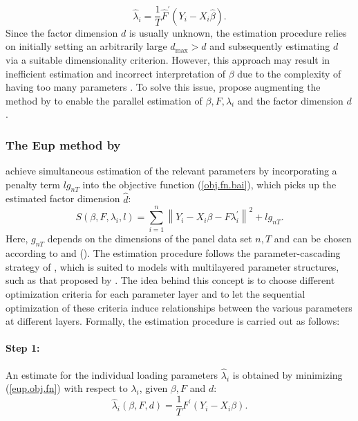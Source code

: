 \begin{equation}
    \hat{\lambda}_i = \frac{1}{T}\hat{F}^{\prime}(Y_i - X_i \hat{\beta}).
\end{equation}
Since the factor dimension $d$ is usually unknown, the estimation procedure relies on initially setting an arbitrarily large $d_{\text{max}} > d$ and subsequently estimating $d$ via a suitable dimensionality criterion. However, this approach may result in inefficient estimation and incorrect interpretation of \(\beta\) due to the complexity of having too many parameters \citep{bada2012phtt}. To solve this issue, \citet{bada2014parameter} propose augmenting the method by \citet{bai2009panel} to enable the parallel estimation of $\beta, F, \lambda_i$ and the factor dimension $d$.

\subsubsection{The \acl{Eup} method by \citet{bada2014parameter}}

\citet{bada2014parameter} achieve simultaneous estimation of the relevant parameters by incorporating a penalty term \(lg_{nT}\) into the objective function (\ref{obj.fn.bai}),  which picks up the estimated factor dimension $\hat{d}$:
\begin{equation}\label{eup.obj.fn}
    S\left(\beta, F, \lambda_i, l\right)=\sum_{i=1}^n\left\|Y_i-X_i \beta-F \lambda_i^{\prime}\right\|^2+l g_{n T} .
\end{equation}
Here, $g_{nT}$ depends on the dimensions of the panel data set $n, T$ and can be chosen according to \citet{bai2002determining} and \citet{bai2004estimating} (). The estimation procedure follows the parameter-cascading strategy of \citet{cao2010linear}, which is suited to models with multilayered parameter structures, such as that proposed by \citet{bai2009panel}.  The idea behind this concept is to choose different optimization criteria for each parameter layer and to let the sequential optimization of these criteria induce relationships between the various parameters at different layers. Formally, the estimation procedure is carried out as follows:

\paragraph{Step 1:} An estimate for the individual loading parameters $\hat{\lambda}_i$ is obtained by minimizing (\ref{eup.obj.fn}) with respect to $\lambda_i$, given $\beta, F$ and $d$:
\begin{equation}\label{eq:lambda_i}
    \hat{\lambda}_i(\beta, F, d)=\frac{1}{T}F^{\prime}\left(Y_i-X_i \beta\right)  .
\end{equation}
